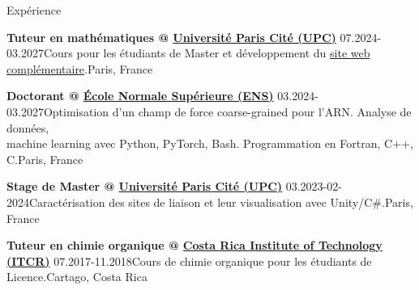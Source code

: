 \address{
    Courriel: \href{mailto:diego.barquero-morera@phys.ens.fr}{diego.barquero-morera@phys.ens.fr}
    $\qquad$ \href{https://diegobarmor.github.io/}{Site web}
    $\qquad$ \href{https://github.com/DiegoBarMor}{GitHub}
    $\qquad$ \href{https://www.linkedin.com/in/diego-barquero-morera-98863020b/}{LinkedIn}
}
\address{Portable: (+33) 745 105 417 $\qquad$ Adresse: Île-de-France, Créteil, 5 Rue des Bordières}



\begin{rSection}{Expérience}
    \vspace{\baselineskip}

    \begin{rSubsectionShort}{
        \bf Tuteur en mathématiques @ \href{https://u-paris.fr/en/}{Université Paris Cité (UPC)}
    }{07.2024-03.2027}{Cours pour les étudiants de Master et développement du \href{https://diegobarmor.github.io/maths-tutorship/}{site web complémentaire}.}{Paris, France}
    \end{rSubsectionShort}

    \begin{rSubsectionShort}{
        \bf Doctorant @ \href{https://www.lpens.ens.psl.eu/}{École Normale Supérieure (ENS)}
    }{03.2024-03.2027}{Optimisation d'un champ de force coarse-grained pour l'ARN. Analyse de données, \\ machine learning avec Python, PyTorch, Bash. Programmation en Fortran, C++, C.}{Paris, France}
    \end{rSubsectionShort}

    \begin{rSubsectionShort}{
        \bf Stage de Master @ \href{https://u-paris.fr/en/}{Université Paris Cité (UPC)}
    }{03.2023-02-2024}{Caractérisation des sites de liaison et leur visualisation avec Unity/C\#.}{Paris, France}
    \end{rSubsectionShort}

    \begin{rSubsectionShort}{
        \bf Tuteur en chimie organique @ \href{https://www.tec.ac.cr/}{Costa Rica Institute of Technology (ITCR)}
    }{07.2017-11.2018}{Cours de chimie organique pour les étudiants de Licence.}{Cartago, Costa Rica}
    \end{rSubsectionShort}

\end{rSection}


